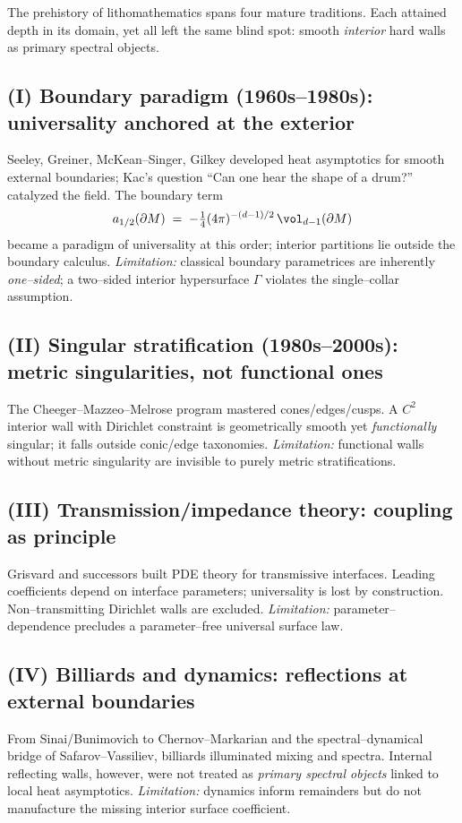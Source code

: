 The prehistory of lithomathematics spans four mature traditions. Each attained depth in its domain, yet all left the same blind spot: smooth \emph{interior} hard walls as primary spectral objects.

\subsection*{(I) Boundary paradigm (1960s–1980s): universality anchored at the exterior}
Seeley, Greiner, McKean–Singer, Gilkey developed heat asymptotics for smooth external boundaries; Kac’s question “Can one hear the shape of a drum?” catalyzed the field.
The boundary term
\[
a_{1/2}(\partial M) \;=\; -\tfrac14(4\pi)^{-(d-1)/2}\,\vol_{d-1}(\partial M)
\]
became a paradigm of universality at this order; interior partitions lie outside the boundary calculus.
\emph{Limitation:} classical boundary parametrices are inherently \emph{one–sided}; a two–sided interior hypersurface $\Gamma$ violates the single–collar assumption.

\subsection*{(II) Singular stratification (1980s–2000s): metric singularities, not functional ones}
The Cheeger–Mazzeo–Melrose program mastered cones/edges/cusps.
A $C^2$ interior wall with Dirichlet constraint is geometrically smooth yet \emph{functionally} singular; it falls outside conic/edge taxonomies.
\emph{Limitation:} functional walls without metric singularity are invisible to purely metric stratifications.

\subsection*{(III) Transmission/impedance theory: coupling as principle}
Grisvard and successors built PDE theory for transmissive interfaces.
Leading coefficients depend on interface parameters; universality is lost by construction.
Non–transmitting Dirichlet walls are excluded.
\emph{Limitation:} parameter–dependence precludes a parameter–free universal surface law.

\subsection*{(IV) Billiards and dynamics: reflections at external boundaries}
From Sinai/Bunimovich to Chernov–Markarian and the spectral–dynamical bridge of Safarov–Vassiliev, billiards illuminated mixing and spectra.
Internal reflecting walls, however, were not treated as \emph{primary spectral objects} linked to local heat asymptotics.
\emph{Limitation:} dynamics inform remainders but do not manufacture the missing interior surface coefficient.

